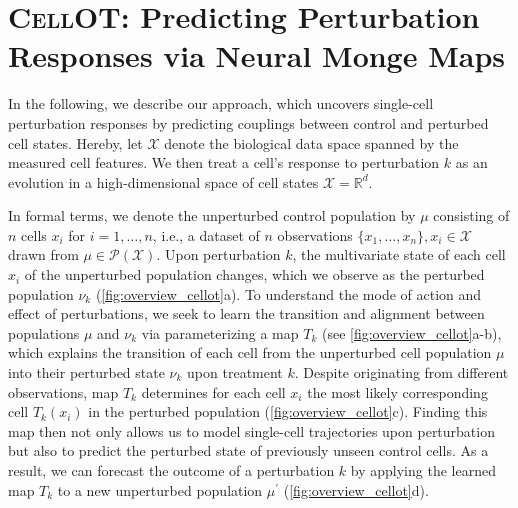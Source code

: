 \section{\textsc{CellOT}: Predicting Perturbation Responses via Neural Monge Maps}

In the following, we describe our approach, which uncovers single-cell perturbation responses by predicting couplings between control and perturbed cell states.
Hereby, let $\mathcal{X}$ denote the biological data space spanned by the measured cell features. We then treat a cell's response to perturbation $k$ as an evolution in a high-dimensional space of cell states $\mathcal{X} = \mathbb{R}^d$.

In formal terms, we denote the unperturbed control population by $\mu$ consisting of $n$ cells $x_i$ for $i = 1, \dots, n$, i.e., a dataset of $n$ observations $\{ x_1, \dots, x_n \}, x_i \in \mathcal{X}$ drawn from $\mu \in \mathcal{P}(\mathcal{X})$. Upon perturbation $k$, the multivariate state of each cell $x_i$ of the unperturbed population changes, which we observe as the perturbed population $\nu_k$ (\cref{fig:overview_cellot}a).
To understand the mode of action and effect of perturbations, we seek to learn the transition and alignment between populations $\mu$ and $\nu_k$ via parameterizing a map $T_k$ (see \cref{fig:overview_cellot}a-b), which explains the transition of each cell from the unperturbed cell population $\mu$ into their perturbed state $\nu_k$ upon treatment $k$.
Despite originating from  different observations, map $T_k$ determines for each cell $x_i$ the most likely corresponding cell $T_k(x_i)$ in the perturbed population (\cref{fig:overview_cellot}c).
Finding this map then not only allows us to model single-cell trajectories upon perturbation but also to predict the perturbed state of previously unseen control cells. As a result, we can forecast the outcome of a perturbation $k$  by applying the learned map $T_k$ to a new unperturbed population $\mu^\prime$ (\cref{fig:overview_cellot}d).


